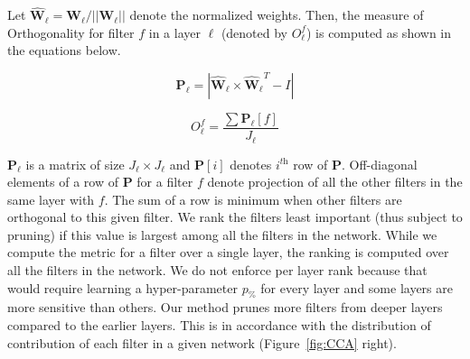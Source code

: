 Let $\boldsymbol{\hat{W}_\ell} = \boldsymbol{W_\ell}/||\boldsymbol{W_\ell}||$ denote the normalized weights.
Then, the measure of Orthogonality for filter $f$ in a layer $\ell$ (denoted by $O_\ell^f$) is computed as shown in the equations below.



\begin{equation}
\boldsymbol{P}_\ell = |\boldsymbol{\hat{W}_\ell} \times \boldsymbol{\hat{W}_\ell}^T - I |
\end{equation}

\begin{equation}
\label{eqn:ortho}
O^f_\ell = \frac{\sum \boldsymbol{P_\ell}[f]}{J_\ell}
\end{equation}

$\boldsymbol{P}_\ell$ is a matrix of size $J_\ell \times J_\ell$ and $\boldsymbol{P}[i]$ denotes $i^{\textit{th}}$ row of $\boldsymbol{P}$.
Off-diagonal elements of a row of $\boldsymbol{P}$ for a filter $f$ denote projection of all the other filters in the same layer with $f$.
The sum of a row is minimum when other filters are orthogonal to this given filter.
We rank the filters least important (thus subject to pruning) if this value is largest among all the filters in the network.
While we compute the metric for a filter over a single layer, the ranking is computed over all the filters in the network.
We do not enforce per layer rank because that would require learning a hyper-parameter $p_\%$ for every layer and some layers are more sensitive than others.
Our method prunes more filters from deeper layers compared to the earlier layers.
This is in accordance with the distribution of contribution of each filter in a given network (Figure~\ref{fig:CCA} right).

